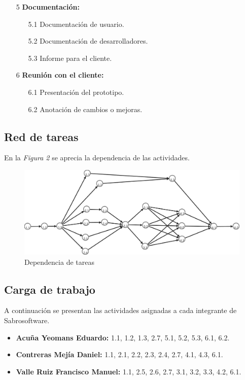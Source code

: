 \documentclass[letterpaper]{article}
\begin{document}
\begin{enumerate}
  \item[5] \textbf{Documentación:}
    \begin{enumerate}
    \item[5.1] Documentación de usuario.
    \item[5.2] Documentación de desarrolladores.
    \item[5.3] Informe para el cliente.
    \end{enumerate}

  \item[6] \textbf{Reunión con el cliente:}
    \begin{enumerate}
    \item[6.1] Presentación del prototipo.
    \item[6.2] Anotación de cambios o mejoras.
    \end{enumerate}
\end{enumerate}

\subsection{Red de tareas}
En la \emph{Figura 2} se aprecia la dependencia de las actividades.
\begin{figure}[h!]
  \centering
  \includegraphics[width=1\textwidth]{RedTareas}
  \caption{Dependencia de tareas}
\end{figure}

\subsection{Carga de trabajo}

A continuación se presentan las actividades asignadas a cada integrante de Sabrosoftware.

\begin{itemize}
\item \textbf{Acuña Yeomans Eduardo:} 1.1, 1.2, 1.3, 2.7, 5.1, 5.2, 5.3, 6.1, 6.2.
\item \textbf{Contreras Mejía Daniel:} 1.1, 2.1, 2.2, 2.3, 2.4, 2.7, 4.1, 4.3, 6.1.
\item \textbf{Valle Ruiz Francisco Manuel:} 1.1, 2.5, 2.6, 2.7, 3.1, 3.2, 3.3, 4.2, 6.1.
\end{itemize}
\end{document}
